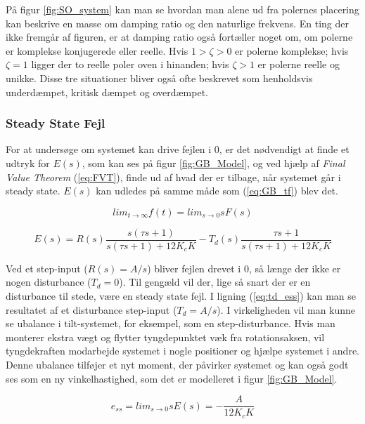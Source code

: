 På figur \ref{fig:SO_system} kan man se hvordan man alene ud fra polernes placering kan beskrive en masse om damping ratio og den naturlige frekvens. En ting der ikke fremgår af figuren, er at damping ratio også fortæller noget om, om polerne er komplekse konjugerede eller reelle. Hvis $1>\zeta>0$ er polerne komplekse; hvis $\zeta=1$ ligger der to reelle poler oven i hinanden; hvis $\zeta>1$ er polerne reelle og unikke. Disse tre situationer bliver også ofte beskrevet som henholdsvis underdæmpet, kritisk dæmpet og overdæmpet.




\subsubsection{Steady State Fejl}

For at undersøge om systemet kan drive fejlen i 0, er det nødvendigt at finde et udtryk for $E(s)$, som kan ses på figur \ref{fig:GB_Model}, og ved hjælp af \textit{Final Value Theorem} (\ref{eq:FVT}), finde ud af hvad der er tilbage, når systemet går i steady state. $E(s)$ kan udledes på samme måde som (\ref{eq:GB_tf}) blev det.

\begin{equation} \label{eq:FVT}
lim_{t \to \infty} f(t) = lim_{s \to 0} sF(s)
\end{equation}

\begin{equation} \label{eq:ess}
E(s)=R(s)\frac{s(\tau s+1)}{s(\tau s+1)+12K_{c}K}-T_{d}(s)\frac{\tau s+1}{s(\tau s+1)+12K_{c}K}
\end{equation}

Ved et step-input ($R(s)=A/s$) bliver fejlen drevet i 0, så længe der ikke er nogen disturbance ($T_{d}=0$). Til gengæld vil der, lige så snart der er en disturbance til stede, være en steady state fejl. I ligning (\ref{eq:td_ess}) kan man se resultatet af et disturbance step-input ($T_{d}=A/s$). I virkeligheden vil man kunne se ubalance i tilt-systemet, for eksempel, som en step-disturbance. Hvis man monterer ekstra vægt og flytter tyngdepunktet væk fra rotationsaksen, vil tyngdekraften modarbejde systemet i nogle positioner og hjælpe systemet i andre. Denne ubalance tilføjer et nyt moment, der påvirker systemet og kan også godt ses som en ny vinkelhastighed, som det er modelleret i figur \ref{fig:GB_Model}.

\begin{equation}\label{eq:td_ess}
e_{ss}=lim_{s \to 0} sE(s)=-\frac{A}{12K_{c}K}
\end{equation}

